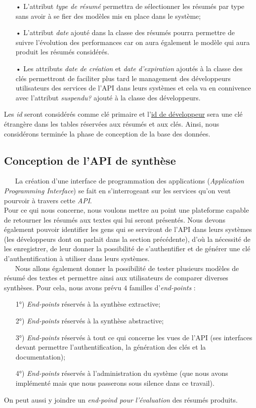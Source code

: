 \begin{itemize}
\item[•] L'attribut \textit{type de résumé} permettra de sélectionner les résumés par type sans avoir à se fier des modèles mis en place dans le système;
\item[•] L'attribut \textit{date} ajouté dans la classe des résumés pourra permettre de suivre l'évolution des performances car on aura également le modèle qui aura produit les résumés considérés.
\item[•] Les attributs \textit{date de création} et \textit{date d'expiration} ajoutés à la classe des clés permettront de faciliter plus tard le management des développeurs utilisateurs des services de l'API dans leurs systèmes et cela va en connivence avec l'attribut \textit{suspendu?} ajouté à la classe des développeurs.
\end{itemize}
Les \textit{id} seront considérés comme clé primaire et l'\underline{id de développeur} sera une clé étrangère dans les tables réservées aux résumés et aux clés. Ainsi, nous considérons terminée la phase de conception de la base des données.
\subsection{Conception de l'API de synthèse}
$ _{} $ $ _{} $ $ _{} $ $ _{} $ $ _{} $La création d'une interface de programmation des applications (\textit{Application Programming Interface}) se fait en s'interrogeant sur les services qu'on veut pourvoir à travers cette \textit{API}.\\
Pour ce qui nous concerne, nous voulons mettre au point une plateforme capable de retourner les résumés aux textes qui lui seront présentés. Nous devons également pouvoir identifier les gens qui se serviront de l'API dans leurs systèmes (les développeurs dont on parlait dans la section précédente), d'où la nécessité de les enregistrer, de leur donner la possibilité de s'authentifier et de générer une clé d'authentification à utiliser dans leurs systèmes.\\
$ _{} $ $ _{} $ $ _{} $ $ _{} $ $ _{} $Nous allons également donner la possibilité de tester plusieurs modèles de résumé des textes et permettre ainsi aux utilisateurs de comparer diverses synthèses. Pour cela, nous avons prévu $ 4 $ familles d'\textit{end-points} :
\begin{itemize}
\item[1°)] \textit{End-points} réservés à la synthèse extractive;
\item[2°)] \textit{End-points} réservés à la synthèse abstractive;
\item[3°)] \textit{End-points} réservés à tout ce qui concerne les vues de l'API (ses interfaces devant permettre l'authentification, la génération des clés et la documentation);
\item[4°)] \textit{End-points} réservés à l'administration du système (que nous avons implémenté mais que nous passerons sous silence dans ce travail).
\end{itemize}
On peut aussi y joindre un \textit{end-poind pour l'évaluation} des résumés produits.
